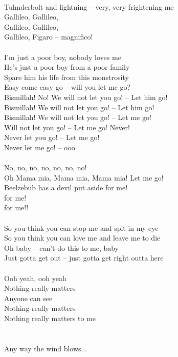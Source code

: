 \\
Tuhnderbolt and lightning -- very, very frightening me \\
Gallileo, Gallileo, \\
Gallileo, Gallileo, \\
Gallileo, Figaro -- magnifico! \\
\\
I'm just a poor boy, nobody loves me \\
He's just a poor boy from a poor family \\
Spare him his life from this monstrosity \\
Easy come easy go -- will you let me go? \\
Bismillah! No! We will not let you go! -- Let him go! \\
Bismillah! We will not let you go! -- Let him go! \\
Bismillah! We will not let you go! -- Let me go! \\
Will not let you go! -- Let me go! Never! \\
Never let you go! -- Let me go! \\
Never let me go! -- ooo \\
\\
No, no, no, no, no, no, no! \\
Oh Mama mia, Mama mia, Mama mia! Let me go! \\
Beelzebub has a devil put aside for me! \\
for me! \\
for me!! \\
\\
So you think you can stop me and spit in my eye \\
So you think you can love me and leave me to die \\
Oh baby -- can't do this to me, baby \\
Just gotta get out -- just gotta get right outta here \\
\\
Ooh yeah, ooh yeah \\
Nothing really matters \\
Anyone can see \\
Nothing really matters \\
Nothing really matters to me \\
\\
\\
Any way the wind blows... \\
\newpage